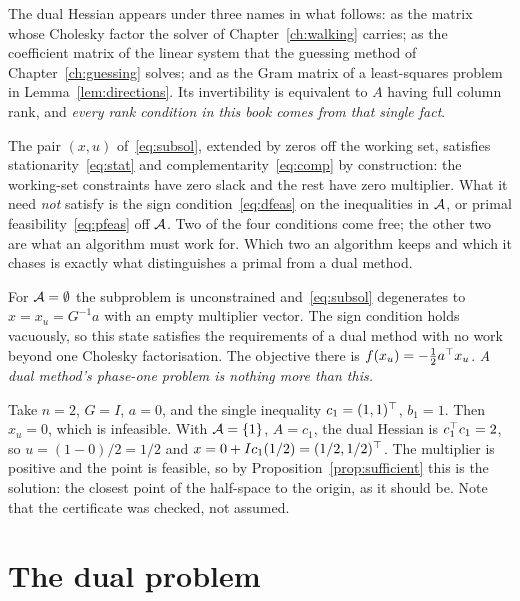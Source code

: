 The dual Hessian appears under three names in what follows: as the matrix whose
Cholesky factor the solver of Chapter~\ref{ch:walking} carries; as the coefficient
matrix of the linear system that the guessing method of Chapter~\ref{ch:guessing}
solves; and as the Gram matrix of a least-squares problem in
Lemma~\ref{lem:directions}. Its invertibility is equivalent to $A$ having full
column rank, and \emph{every rank condition in this book comes from that single
fact}.

The pair $(x,u)$ of~\eqref{eq:subsol}, extended by zeros off the working set,
satisfies stationarity~\eqref{eq:stat} and complementarity~\eqref{eq:comp} by
construction: the working-set constraints have zero slack and the rest have zero
multiplier. What it need \emph{not} satisfy is the sign condition~\eqref{eq:dfeas}
on the inequalities in $\mathcal{A}$, or primal feasibility~\eqref{eq:pfeas} off
$\mathcal{A}$. Two of the four conditions come free; the other two are what an
algorithm must work for. Which two an algorithm keeps and which it chases is
exactly what distinguishes a primal from a dual method.

\begin{remark}
\label{rem:cold}
For $\mathcal{A} = \emptyset$ the subproblem is unconstrained and~\eqref{eq:subsol}
degenerates to $x = x_u = G^{-1}a$ with an empty multiplier vector. The sign
condition holds vacuously, so this state satisfies the requirements of a dual
method with no work beyond one Cholesky factorisation. The objective there is
$f(x_u) = -\tfrac12 a^{\top} x_u$. \emph{A dual method's phase-one problem is nothing
more than this.}
\end{remark}

\begin{example}
Take $n = 2$, $G = I$, $a = 0$, and the single inequality
$c_1 = (1,1)^{\top}$, $b_1 = 1$. Then $x_u = 0$, which is infeasible. With
$\mathcal{A} = \{1\}$, $A = c_1$, the dual Hessian is $c_1^{\top} c_1 = 2$, so
$u = (1 - 0)/2 = 1/2$ and $x = 0 + I c_1 (1/2) = (1/2,1/2)^{\top}$. The multiplier is
positive and the point is feasible, so by Proposition~\ref{prop:sufficient} this
is the solution: the closest point of the half-space to the origin, as it should
be. Note that the certificate was checked, not assumed.
\end{example}

\section{The dual problem}

